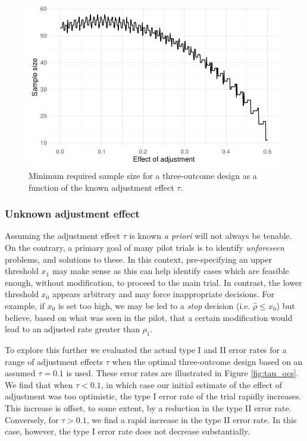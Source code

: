 \documentclass[sagev]{sagej}
\begin{document}
\begin{figure}
\centering
\includegraphics[scale=0.8]{./figures/tau_ns}
\caption{Minimum required sample size for a three-outcome design as a function of the known adjustment effect $\tau$.}
\label{fig:tau_ns}
\end{figure}

\subsubsection{Unknown adjustment effect}

Assuming the adjustment effect $\tau$ is known \emph{a priori} will not always be tenable. On the contrary, a primary goal of many pilot trials is to identify \emph{unforeseen} problems, and solutions to these. In this context, pre-specifying an upper threshold $x_1$ may make sense as this can help identify cases which are feasible enough, without modification, to proceed to the main trial. In contrast, the lower threshold $x_0$ appears arbitrary and may force inappropriate decisions. For example, if $x_0$ is set too high, we may be led to a \emph{stop} decision (i.e. $\hat{\rho} \leq x_0$) but believe, based on what was seen in the pilot, that a certain modification would lead to an adjusted rate greater than $\rho_1$. 

To explore this further we evaluated the actual type I and II error rates for a range of adjustment effects $\tau$ when the optimal three-outcome design based on an assumed $\tau = 0.1$ is used. These error rates are illustrated in Figure \ref{fig:tau_ocs}. We find that when $\tau < 0.1$, in which case our initial estimate of the effect of adjustment was too optimistic, the type I error rate of the trial rapidly increases. This increase is offset, to some extent, by a reduction in the type II error rate. Conversely, for $\tau > 0.1$, we find a rapid increase in the type II error rate. In this case, however, the type I error rate does not decrease substantially. 
\end{document}

